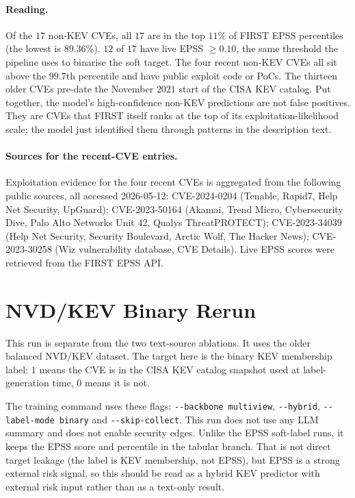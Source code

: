 \documentclass[11pt]{article}
\begin{document}
\paragraph{Reading.}
Of the $17$ non-KEV CVEs, all $17$ are in the top $11\%$ of FIRST EPSS
percentiles (the lowest is $89.36\%$). $12$ of $17$ have live EPSS
$\geq 0.10$, the same threshold the pipeline uses to binarise the
soft target. The four recent non-KEV CVEs all sit above the $99.7$th
percentile and have public exploit code or PoCs. The thirteen older
CVEs pre-date the November $2021$ start of the CISA KEV catalog. Put
together, the model's high-confidence non-KEV predictions are not
false positives. They are CVEs that FIRST itself ranks at the top of
its exploitation-likelihood scale; the model just identified them
through patterns in the description text.

\paragraph{Sources for the recent-CVE entries.}
Exploitation evidence for the four recent CVEs is aggregated from the
following public sources, all accessed 2026-05-12:
CVE-2024-0204 (Tenable, Rapid7, Help Net Security, UpGuard);
CVE-2023-50164 (Akamai, Trend Micro, Cybersecurity Dive, Palo Alto
Networks Unit 42, Qualys ThreatPROTECT);
CVE-2023-34039 (Help Net Security, Security Boulevard, Arctic Wolf,
The Hacker News);
CVE-2023-30258 (Wiz vulnerability database, CVE Details). Live EPSS
scores were retrieved from the FIRST EPSS API.

\section{NVD/KEV Binary Rerun}

This run is separate from the two text-source ablations. It uses the
older balanced NVD/KEV dataset. The target here is the binary KEV
membership label: $1$ means the CVE is in the CISA KEV catalog
snapshot used at label-generation time, $0$ means it is not.

The training command uses these flags: \texttt{-{}-backbone multiview},
\texttt{-{}-hybrid}, \texttt{-{}-label-mode binary} and
\texttt{-{}-skip-collect}. This run does not use any LLM summary and
does not enable security
edges. Unlike the EPSS soft-label runs, it keeps the EPSS score and
percentile in the tabular branch. That is not direct target leakage
(the label is KEV membership, not EPSS), but EPSS is a strong external
risk signal, so this should be read as a hybrid KEV predictor with
external risk input rather than as a text-only result.
\end{document}
